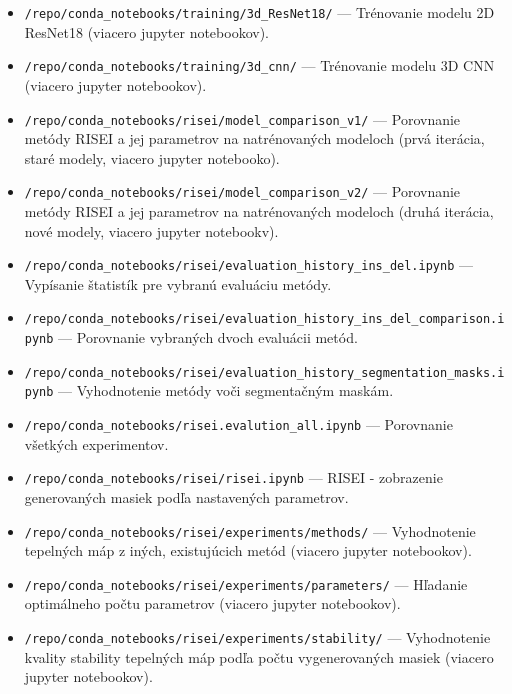 \begin{itemize}
    \item \texttt{/repo/conda\_notebooks/training/3d\_ResNet18/} --- Trénovanie modelu 2D ResNet18 (viacero jupyter notebookov).
    \item \texttt{/repo/conda\_notebooks/training/3d\_cnn/} --- Trénovanie modelu 3D CNN (viacero jupyter notebookov).
    \item \texttt{/repo/conda\_notebooks/risei/model\_comparison\_v1/} --- Porovnanie metódy RISEI a jej parametrov na natrénovaných modeloch (prvá iterácia, staré modely, viacero jupyter notebooko).
    \item \texttt{/repo/conda\_notebooks/risei/model\_comparison\_v2/} --- Porovnanie metódy RISEI a jej parametrov na natrénovaných modeloch (druhá iterácia, nové modely, viacero jupyter notebookv).
    \item \texttt{/repo/conda\_notebooks/risei/evaluation\_history\_ins\_del\-.ipynb} --- Vypísanie štatistík pre vybranú evaluáciu metódy.
    \item \texttt{/repo/conda\_notebooks/risei/evaluation\_history\_ins\_del\-\_comparison\-.ipynb} --- Porovnanie vybraných dvoch evaluácii metód.
    \item \texttt{/repo/conda\_notebooks/risei/evaluation\_history\_\-segmentation\-\_masks\-.ipynb} --- Vyhodnotenie metódy voči segmentačným maskám.
    \item \texttt{/repo/conda\_notebooks/risei.evalution\_all.ipynb} --- Porovnanie všetkých experimentov.
    \item \texttt{/repo/conda\_notebooks/risei/risei.ipynb} --- RISEI - zobrazenie generovaných masiek podľa nastavených parametrov.
    \item \texttt{/repo/conda\_notebooks/risei/experiments/methods/} --- Vyhodnotenie tepelných máp z iných, existujúcich metód (viacero jupyter notebookov).
    \item \texttt{/repo/conda\_notebooks/risei/experiments/parameters/} --- Hľadanie optimálneho počtu parametrov (viacero jupyter notebookov).
    \item \texttt{/repo/conda\_notebooks/risei/experiments/stability/} --- Vyhodnotenie kvality stability tepelných máp podľa počtu vygenerovaných masiek (viacero jupyter notebookov).
\end{itemize}
